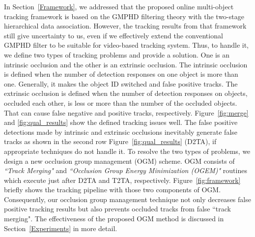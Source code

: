 \documentclass[journal]{IEEEtran}
\newcounter{ct}
\begin{document}
In Section~\ref{Framework}, we addressed that the proposed online multi-object tracking framework is based on the GMPHD filtering theory with the two-stage hierarchical data association. However, the tracking results from that framework still give uncertainty to us, even if we effectively extend the conventional GMPHD filter to be suitable for video-based tracking system. Thus, to handle it, we define two types of tracking problems and provide a solution. One is an intrinsic occlusion and the other is an extrinsic occlusion. The intrinsic occlusion is defined when the number of detection responses on one object is more than one. Generally, it makes the object ID switched and false positive tracks. The extrinsic occlusion is defined when the number of detection responses on objects, occluded each other, is less or more than the number of the occluded objects. That can cause false negative and positive tracks, respectively. 
Figure~\ref{fig:merge} and \ref{fig:qual_results} show the defined tracking issues well. 
The false positive detections made by intrinsic and extrinsic occlusions inevitably generate false tracks as shown in the second row Figure~\ref{fig:qual_results} (D2TA), if appropriate techniques do not handle it.  
To resolve the two types of problems, we design a new occlusion group management (OGM) scheme.
OGM consists of \textit{``Track Merging"} and \textit{``Occlusion Group Energy Minimization (OGEM)"} routines which execute just after D2TA and T2TA, respectively. 
Figure~\ref{fig:framework} briefly shows the tracking pipeline with those two components of OGM.
Consequently, our occlusion group management technique not only decreases false positive tracking results 
but also prevents occluded tracks from false ``track merging".
The effectiveness of the proposed OGM method is discussed in Section~\ref{Experiments} in more detail.
\end{document}

